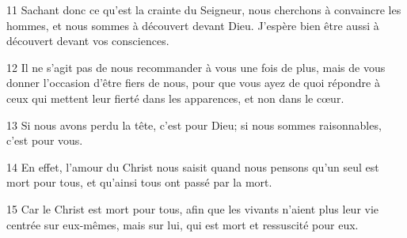 
11 Sachant donc ce qu’est la crainte du Seigneur, nous cherchons à convaincre les hommes, et nous sommes à découvert devant Dieu. J’espère bien être aussi à découvert devant vos consciences.

12 Il ne s’agit pas de nous recommander à vous une fois de plus, mais de vous donner l’occasion d’être fiers de nous, pour que vous ayez de quoi répondre à ceux qui mettent leur fierté dans les apparences, et non dans le cœur.

13 Si nous avons perdu la tête, c’est pour Dieu; si nous sommes raisonnables, c’est pour vous.

14 En effet, l’amour du Christ nous saisit quand nous pensons qu’un seul est mort pour tous, et qu’ainsi tous ont passé par la mort.

15 Car le Christ est mort pour tous, afin que les vivants n’aient plus leur vie centrée sur eux-mêmes, mais sur lui, qui est mort et ressuscité pour eux.